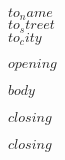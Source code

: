 \documentclass[11pt,a4paper]{dinbrief}
\begin{document}
\subject{\textbf{$subject$}}

\begin{letter}{
$to_name$ \\
$to_street$ \\[\medskipamount]
$to_city$}

\opening{$opening$}
\Datum{\today}

$body$


{
    \closing[{\texttt{[image: \$signature\$]}}]{$closing$}
}
{
    \closing[]{$closing$}
}

\end{letter}
\end{document}
